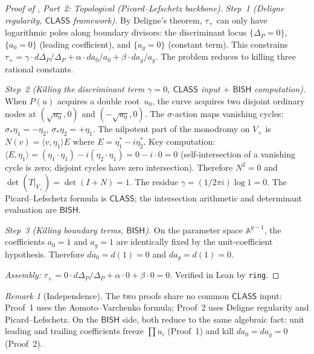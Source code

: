 \documentclass[11pt]{article}
\theoremstyle{plain}
\theoremstyle{definition}
\theoremstyle{remark}
\newtheorem{remark}[theorem]{Remark}
\newcommand{\Aff}{\mathbb{A}}
\newcommand{\BISH}{\mathsf{BISH}}
\newcommand{\CLASS}{\mathsf{CLASS}}
\begin{document}
\begin{proof}[Proof of , Part~2: Topological
  (Picard--Lefschetz backbone)]
\mbox{}

\emph{Step~1 (Deligne regularity, $\CLASS$ framework).}  By Deligne's theorem, $\tau_+$ can only have logarithmic poles along boundary divisors: the discriminant locus $\{\Delta_P = 0\}$, $\{a_0 = 0\}$ (leading coefficient), and $\{a_g = 0\}$ (constant term).  This constrains $\tau_+ = \gamma \cdot d\Delta_P / \Delta_P + \alpha \cdot da_0/a_0 + \beta \cdot da_g/a_g$.  The problem reduces to killing three rational constants.

\emph{Step~2 (Killing the discriminant term $\gamma = 0$, $\CLASS$ input $+$ $\BISH$ computation).}  When $P(u)$ acquires a double root~$u_0$, the curve acquires two disjoint ordinary nodes at $(\sqrt{u_0}, 0)$ and $(-\sqrt{u_0}, 0)$.  The $\sigma$-action maps vanishing cycles: $\sigma_* \eta_1 = -\eta_2$, $\sigma_* \eta_2 = +\eta_1$.  The nilpotent part of the monodromy on $V_+$ is $N(v) = \langle v, \eta_1 \rangle E$ where $E = \eta_1^* - i\eta_2^*$.  Key computation: $\langle E, \eta_1 \rangle = (\eta_1 \cdot \eta_1) - i(\eta_2 \cdot \eta_1) = 0 - i \cdot 0 = 0$ (self-intersection of a vanishing cycle is zero; disjoint cycles have zero intersection).  Therefore $N^2 = 0$ and $\det(T|_{V_+}) = \det(I + N) = 1$.  The residue $\gamma = (1/2\pi i)\log 1 = 0$.  The Picard--Lefschetz formula is $\CLASS$; the intersection arithmetic and determinant evaluation are $\BISH$.

\emph{Step~3 (Killing boundary terms, $\BISH$).}  On the parameter space $\Aff^{g-1}$, the coefficients $a_0 = 1$ and $a_g = 1$ are identically fixed by the unit-coefficient hypothesis.  Therefore $da_0 = d(1) = 0$ and $da_g = d(1) = 0$.

\emph{Assembly:} $\tau_+ = 0 \cdot d\Delta_P/\Delta_P + \alpha \cdot 0 + \beta \cdot 0 = 0$.  Verified in Lean by \texttt{ring}.
\end{proof}

\begin{remark}[Independence]
The two proofs share no common $\CLASS$ input: Proof~1 uses the Aomoto--Varchenko formula; Proof~2 uses Deligne regularity and Picard--Lefschetz.  On the $\BISH$ side, both reduce to the same algebraic fact: unit leading and trailing coefficients freeze $\prod u_i$ (Proof~1) and kill $da_0 = da_g = 0$ (Proof~2).
\end{remark}


\end{document}
